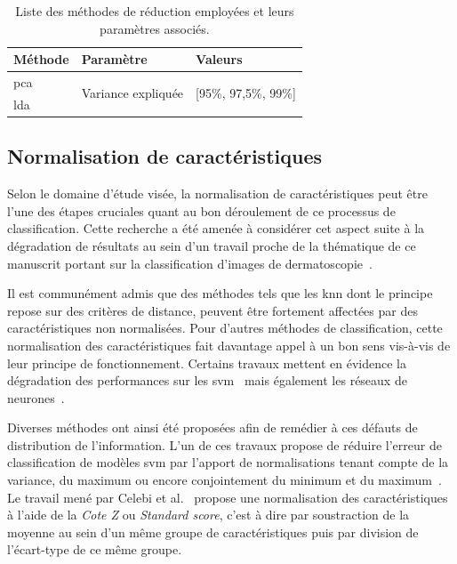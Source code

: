 \begin{table}[H]
    \centering
    \begin{tabular}{lll}
        \toprule
        \textbf{Méthode}       & \textbf{Paramètre}                 & \textbf{Valeurs}                      \\ \midrule
        \gls{pca}              & \multirow{2}{*}{Variance expliquée}& \multirow{2}{*}{[95\%, 97,5\%, 99\%]} \\ \cline{1-1}
        \gls{lda}              &                                    &                                       \\ 
        \bottomrule
    \end{tabular}
    \caption{Liste des méthodes de réduction employées et leurs paramètres associés.}
    \label{tab:summary_reduction_methods}
\end{table}\par

\subsection{Normalisation de caractéristiques}
\label{subsec:features_normalisation}
Selon le domaine d'étude visée, la normalisation de caractéristiques peut être l'une des étapes cruciales quant au bon déroulement de ce processus de classification. Cette recherche a été amenée à considérer cet aspect suite à la dégradation de résultats au sein d'un travail proche de la thématique de ce manuscrit portant sur la classification d'images de dermatoscopie~\cite{Celebi2007}.\par

Il est communément admis que des méthodes tels que les \gls{knn} dont le principe repose sur des critères de distance, peuvent être fortement affectées par des caractéristiques non normalisées. Pour d'autres méthodes de classification, cette normalisation des caractéristiques fait davantage appel à un bon sens vis-à-vis de leur principe de fonctionnement. Certains travaux mettent en évidence la dégradation des performances sur les \gls{svm}~\cite{Juszczak2002} mais également les réseaux de neurones~\cite{Celebi2007}.\par

Diverses méthodes ont ainsi été proposées afin de remédier à ces défauts de distribution de l'information. L'un de ces travaux propose de réduire l'erreur de classification de modèles \gls{svm} par l'apport de normalisations tenant compte de la variance, du maximum ou encore conjointement du minimum et du maximum~\cite{Juszczak2002}. Le travail mené par Celebi et al.~\cite{Celebi2007} propose une normalisation des caractéristiques à l'aide de la \textit{Cote Z} ou \textit{Standard score}, c'est à dire par soustraction de la moyenne au sein d'un même groupe de caractéristiques puis par division de l'écart-type de ce même groupe.\par

